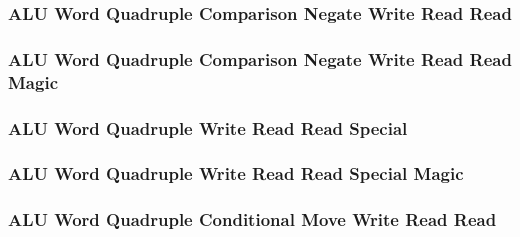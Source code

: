 \subsubsection[{\small ALU Word Quadruple Comparison Negate Write Read Read}]{ALU Word Quadruple Comparison Negate Write Read Read} \label{sec:format-ALU-WQCNWRR}



\subsubsection[{\small ALU Word Quadruple Comparison Negate Write Read Read Magic}]{ALU Word Quadruple Comparison Negate Write Read Read Magic} \label{sec:format-ALU-WQCNWRR.M}



\subsubsection[{\small ALU Word Quadruple Write Read Read Special}]{ALU Word Quadruple Write Read Read Special} \label{sec:format-ALU-WQWRRS}



\subsubsection[{\small ALU Word Quadruple Write Read Read Special Magic}]{ALU Word Quadruple Write Read Read Special Magic} \label{sec:format-ALU-WQWRRS.M}



\subsubsection[{\small ALU Word Quadruple Conditional Move Write Read Read}]{ALU Word Quadruple Conditional Move Write Read Read} \label{sec:format-ALU-WQCMWRR}



